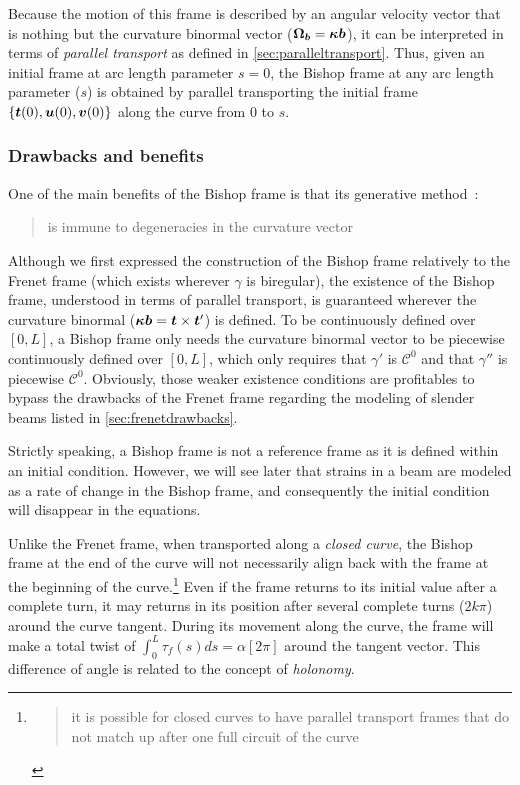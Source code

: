Because the motion of this frame is described by an angular velocity vector that is nothing but the curvature binormal vector ($\boldsymbol{\Omega_b} = \boldsymbol{\kappa b}$), it can be interpreted in terms of \emph{parallel transport} as defined in \cref{sec:paralleltransport}. Thus, given an initial frame at arc length parameter $s=0$, the Bishop frame at any arc length parameter ($s$) is obtained by parallel transporting the initial frame $\{\boldsymbol{t}(0),\boldsymbol{u}(0), \boldsymbol{v}(0)\}$ along the curve from $0$ to $s$.

\subsubsection{Drawbacks and benefits}
One of the main benefits of the Bishop frame is that its generative method~: \blockcquote{Bloomenthal1990}{is immune to degeneracies in the curvature vector}. Although we first expressed the construction of the Bishop frame relatively to the Frenet frame (which exists wherever $\gamma$ is biregular), the existence of the Bishop frame, understood in terms of parallel transport, is guaranteed wherever the curvature binormal ($\boldsymbol{\kappa b} = \boldsymbol{t} \times \boldsymbol{t}'$) is defined. To be continuously defined over $[0,L]$, a Bishop frame only needs the curvature binormal vector to be piecewise continuously defined over  $[0,L]$, which only requires that $\gamma'$ is $\mathcal{C}^0$ and that $\gamma''$ is piecewise $\mathcal{C}^0$. Obviously, those weaker existence conditions are profitables to bypass the drawbacks of the Frenet frame regarding the modeling of slender beams listed in \cref{sec:frenetdrawbacks}.

Strictly speaking, a Bishop frame is not a reference frame as it is defined within an initial condition. However, we will see later that strains in a beam are modeled as a rate of change in the Bishop frame, and consequently the initial condition will disappear in the equations.

Unlike the Frenet frame, when transported along a \emph{closed curve}, the Bishop frame at the end of the curve will not necessarily align back with the frame at the beginning of the curve.\footnote{\blockcquote{Hanson95}{it is possible for closed curves to have parallel transport frames that do not match up after one full circuit of the curve}.} Even if the frame returns to its initial value after a complete turn, it may returns in its position after several complete turns ($2k\pi$) around the curve tangent. During its movement along the curve, the frame will make a total twist of $\int_0^L \tau_f(s)ds = \alpha[2\pi]$ around the tangent vector. This difference of angle is related to the concept of \emph{holonomy}.

